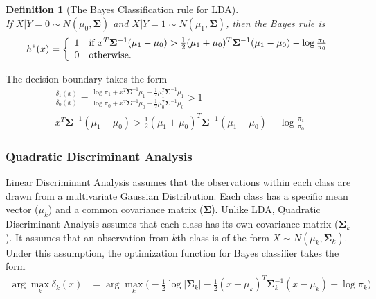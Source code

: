 \documentclass[12pt,a4paper]{article}%
\newtheorem{definition}{Definition}
\theoremstyle{definition}
\theoremstyle{plain}
\numberwithin{equation}{section}
\begin{document}
\begin{framed}
\begin{definition}[The Bayes Classification rule for LDA]
~\\
If $X|Y=0 \sim N(\mu_{0}, \boldsymbol{\Sigma})$ and $X|Y=1 \sim N(\mu_{1}, \boldsymbol{\Sigma})$, then the Bayes rule is 
\begin{gather*}
h^{*}(x) = \left\{
  \begin{array}{ll}
    1 & \mbox{\rm if } x^{T} \boldsymbol{\Sigma}^{-1} (\mu_{1}-\mu_{0}) > \frac{1}{2}(\mu_{1}+\mu_{0})^{T} \boldsymbol{\Sigma}^{-1} (\mu_{1}-\mu_{0})- \log \frac{\pi_{1}}{\pi_{0}} \\
    0 & \mbox{\rm otherwise.} \\
   \end{array} \right.
\end{gather*}
\end{definition}
\end{framed}

The decision boundary takes the form 
\begin{gather*}
\frac{\delta_{1}(x)}{\delta_{0}(x)} = \frac{\log \pi_{1} + x^{T}\boldsymbol{\Sigma}^{-1}\mu_{1}-\frac{1}{2}\mu_{1}^{T}\boldsymbol{\Sigma}^{-1}\mu_{1}}{\log \pi_{0} + x^{T}\boldsymbol{\Sigma}^{-1}\mu_{0}-\frac{1}{2}\mu_{0}^{T}\boldsymbol{\Sigma}^{-1}\mu_{0}} > 1 \\
x^{T} \boldsymbol{\Sigma}^{-1} (\mu_{1}-\mu_{0}) > \frac{1}{2} (\mu_{1} + \mu_{0})^{T} \boldsymbol{\Sigma}^{-1} (\mu_{1} - \mu_{0}) - \log \frac{\pi_{1}}{\pi_{0}} 
\end{gather*}

\subsubsection{\textbf{Quadratic Discriminant Analysis}}
Linear Discriminant Analysis assumes that the observations within each class are drawn from a multivariate Gaussian Distribution.
Each class has a specific mean vector ($\mu_{k}$) and a common covariance matrix ($\boldsymbol{\Sigma}$).
Unlike LDA, Quadratic Discriminant Analysis assumes that each class has its own covariance matrix ($\boldsymbol{\Sigma}_{k}$).
It assumes that an observation from $k$th class is of the form $X \sim N(\mu_{k}, \boldsymbol{\Sigma}_{k})$. 
Under this assumption, the optimization function for Bayes classifier takes the form
\begin{align*}
\arg\max_{k}  \delta_{k}(x) &= \arg\max_{k} \bigg( -\frac{1}{2} \log |\boldsymbol{\Sigma}_{k}|-\frac{1}{2}(x-\mu_{k})^{T} \boldsymbol{\Sigma}_{k}^{-1} (x-\mu_{k})+ \log \pi_{k}   \bigg)
\end{align*}
\end{document}
